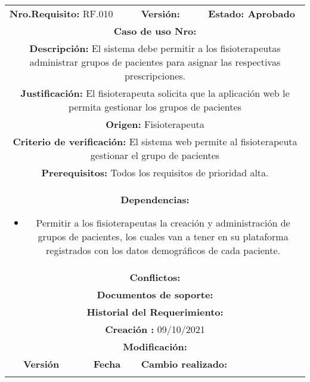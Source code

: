 \begin{center}
\begin{tabular}{|c|c|p{4cm}|p{4cm}|}
            \hline
            \rowcolor{red} \multicolumn{4}{|c|}{\textbf{Prioridad:} Alta}  \\
            \hline
            \multicolumn{2}{|l}{\textbf{Nro.Requisito: }RF.010} & \multicolumn{1}{|l}{\textbf{Versión: }} & \multicolumn{1}{|l|}{\textbf{Estado: Aprobado}} \\
            \multicolumn{4}{|p{13cm}|}{\textbf{Caso de uso Nro: }}  \\
            \hline
            \multicolumn{4}{|p{13cm}|}{\textbf{Descripción: } El sistema debe permitir a los fisioterapeutas administrar grupos de pacientes para asignar las respectivas prescripciones. } \\
            \multicolumn{4}{|p{13cm}|}{\textbf{Justificación: } El fisioterapeuta solicita que la aplicación web le permita gestionar los grupos de pacientes} \\ 
            \multicolumn{4}{|p{13cm}|}{\textbf{Origen: }Fisioterapeuta}  \\
            \multicolumn{4}{|p{13cm}|}{\textbf{Criterio de verificación: } El sistema web permite al fisioterapeuta gestionar el grupo de pacientes} \\
            \hline
            \multicolumn{4}{|p{13cm}|}{\textbf{Prerequisitos: } Todos los requisitos de prioridad alta. }\\
            \hline \multicolumn{4}{|p{12cm}|}{\textbf{Dependencias: }
               \begin{itemize}
                   \item Permitir a los fisioterapeutas la creación y administración de grupos de pacientes, los cuales van a tener en su plataforma registrados con los datos demográficos de cada paciente.
               \end{itemize}
              }  \\
            \multicolumn{4}{|p{12cm}|}{\textbf{Conflictos: }}  \\
            \hline
            \multicolumn{4}{|p{12cm}|}{\textbf{Documentos de soporte: }}  \\
            \hline
            \multicolumn{4}{|p{12cm}|}{\textbf{Historial del Requerimiento: }}  \\
            \multicolumn{4}{|p{12cm}|}{\textbf{Creación : }09/10/2021}  \\
            \multicolumn{4}{|p{12cm}|}{\textbf{Modificación: }}  \\
             \textbf{Versión} & \textbf{Fecha} & \multicolumn{2}{p{8cm}|}{\textbf{Cambio realizado:}} \\
            \hline
                 & &   \multicolumn{2}{p{8cm}|}{}
              \\
            \hline
\end{tabular}




\end{center}
